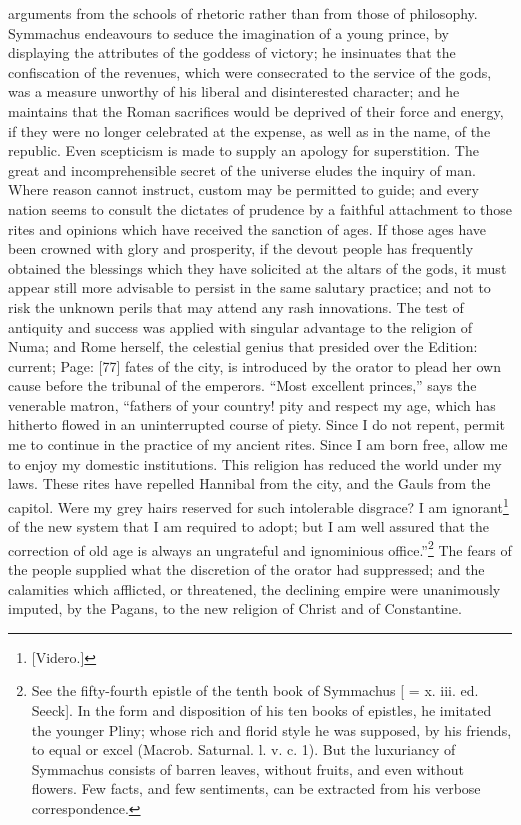 arguments from the schools of rhetoric rather than from those of philosophy. Symmachus endeavours to seduce the imagination of a young prince, by displaying the attributes of the goddess of victory; he insinuates that the confiscation of the revenues, which were consecrated to the service of the gods, was a measure unworthy of his liberal and disinterested character; and he maintains that the Roman sacrifices would be deprived of their force and energy, if they were no longer celebrated at the expense, as well as in the name, of the republic. Even scepticism is made to supply an apology for superstition. The great and incomprehensible secret of the universe eludes the inquiry of man. Where reason cannot instruct, custom may be permitted to guide; and every nation seems to consult the dictates of prudence by a faithful attachment to those rites and opinions which have received the sanction of ages. If those ages have been crowned with glory and prosperity, if the devout people has frequently obtained the blessings which they have solicited at the altars of the gods, it must appear still more advisable to persist in the same salutary practice; and not to risk the unknown perils that may attend any rash innovations. The test of antiquity and success was applied with singular advantage to the religion of Numa; and Rome herself, the celestial genius that presided over the Edition: current; Page: [77] fates of the city, is introduced by the orator to plead her own cause before the tribunal of the emperors. \texthebrew{“}Most excellent princes,\texthebrew{}” says the venerable matron, \texthebrew{“}fathers of your country! pity and respect my age, which has hitherto flowed in an uninterrupted course of piety. Since I do not repent, permit me to continue in the practice of my ancient rites. Since I am born free, allow me to enjoy my domestic institutions. This religion has reduced the world under my laws. These rites have repelled Hannibal from the city, and the Gauls from the capitol. Were my grey hairs reserved for such intolerable disgrace? I am ignorant\footnote{[Videro.]} of the new system that I am required to adopt; but I am well assured that the correction of old age is always an ungrateful and ignominious office.\texthebrew{}”\footnote{See the fifty-fourth epistle of the tenth book of Symmachus [ = x. iii. ed. Seeck]. In the form and disposition of his ten books of epistles, he imitated the younger Pliny; whose rich and florid style he was supposed, by his friends, to equal or excel (Macrob. Saturnal. l. v. c. 1). But the luxuriancy of Symmachus consists of barren leaves, without fruits, and even without flowers. Few facts, and few sentiments, can be extracted from his verbose correspondence.} The fears of the people supplied what the discretion of the orator had suppressed; and the calamities which afflicted, or threatened, the declining empire were unanimously imputed, by the Pagans, to the new religion of Christ and of Constantine.

